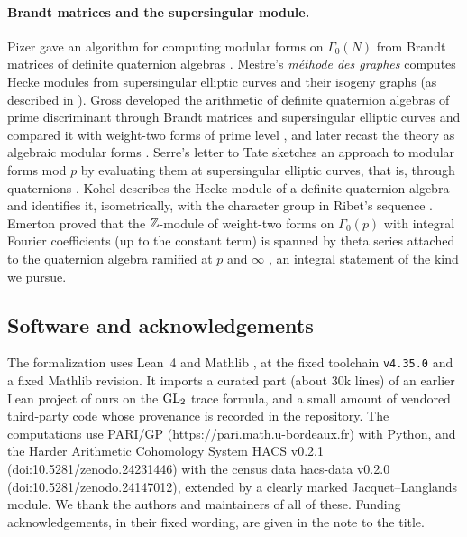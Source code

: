 \paragraph{Brandt matrices and the supersingular module.} Pizer gave an algorithm for computing modular forms on $\Gamma_0(N)$
from Brandt matrices of definite quaternion algebras \cite{Piz80}. Mestre's \emph{m\'ethode des graphes} computes Hecke modules
from supersingular elliptic curves and their isogeny graphs \cite{Mes86} (as described in \cite[\S3]{Koh01}). Gross developed the
arithmetic of definite quaternion algebras of prime discriminant through Brandt matrices and supersingular elliptic curves and
compared it with weight-two forms of prime level \cite[\S\S1--2, 5]{Gro87}, and later recast the theory as algebraic modular forms
\cite{Gr99}. Serre's letter to Tate sketches an approach to modular forms mod $p$ by evaluating them at supersingular elliptic
curves, that is, through quaternions \cite[Abstract]{SL96}. Kohel describes the Hecke module of a definite quaternion algebra
and identifies it, isometrically, with the character group in Ribet's sequence \cite[Thms.~4.2, 4.3]{Koh01}. Emerton proved that
the $\mathbb{Z}$-module of weight-two forms on $\Gamma_0(p)$ with integral Fourier coefficients (up to the constant term) is spanned by
theta series attached to the quaternion algebra ramified at $p$ and $\infty$ \cite[Abstract]{Eme02}, an integral statement of
the kind we pursue.

\subsection{Software and acknowledgements}

The formalization uses Lean~4 \cite{Lean4} and Mathlib \cite{Mathlib20}, at the fixed toolchain \texttt{v4.35.0} and a fixed
Mathlib revision. It imports a curated part (about 30k lines) of an earlier Lean project of ours on the $\mathrm{GL}_2$ trace formula, and
a small amount of vendored third-party code whose provenance is recorded in the repository. The computations use PARI/GP
(\url{https://pari.math.u-bordeaux.fr}) with Python, and the Harder Arithmetic Cohomology System HACS v0.2.1
(doi:10.5281/zenodo.24231446) with the census data hacs-data v0.2.0 (doi:10.5281/zenodo.24147012), extended by a clearly
marked Jacquet--Langlands module. We thank the authors and maintainers of all of these. Funding acknowledgements, in their
fixed wording, are given in the note to the title.
